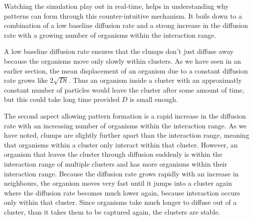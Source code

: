 \documentclass{article}
\begin{document}
Watching the simulation play out in real-time, helps in understanding why patterns can form through this counter-intuitive mechanism.
It boils down to a combination of a low baseline diffusion rate and a strong increase in the diffusion rate with a growing number of organisms within the interaction range.

A low baseline diffusion rate ensures that the clumps don't just diffuse away because the organisms move only slowly within clusters.
As we have seen in an earlier section, the mean displacement of an organism due to a constant diffusion rate grows like $2\sqrt{Dt}$. 
Thus an organism inside a cluster with an approximatly constant number of particles would leave the cluster after some amount of time, but this could take long time provided $D$ is small enough.

The second aspect allowing pattern formation is a rapid increase in the diffusion rate with an increasing number of organisms within the interaction range. 
As we have noted, clumps are slightly further apart than the interaction range, meaning that organisms within a cluster only interact within that cluster.
However, an organism that leaves the cluster through diffusion suddenly is within the interaction range of multiple clusters and has more organisms within their interaction range. 
Because the diffusion rate grows rapidly with an increase in neighbours, the organism moves very fast until it jumps into a cluster again where the diffusion rate becomes much lower again, because interaction occurs only within that cluster.
Since organisms take much longer to diffuse out of a cluster, than it takes them to be captured again, the clusters are stable.

\end{document}
